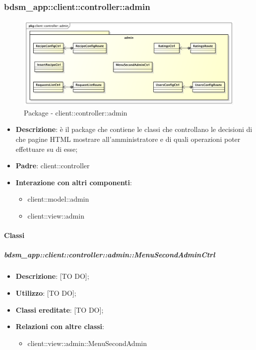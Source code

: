 





\subsubsection{bdsm\_app::client::controller::admin} %
\label{ssub:bdsm_app_client_controller_admin}
\begin{figure}[htbp]
	\centering
	\centerline{\includegraphics[scale=0.45]{./images/client_controller_admin.pdf}}
	\caption{Package - client::controller::admin}
\end{figure}

\begin{itemize}
	\item \textbf{Descrizione}: è il package che contiene le classi che controllano le decisioni di che pagine HTML mostrare all'amministratore e di quali operazioni poter effettuare su di esse;
	\item \textbf{Padre}: client::controller
	\item \textbf{Interazione con altri componenti}:
		\begin{itemize}
			\item client::model::admin
			\item client::view::admin
		\end{itemize}
\end{itemize}

	\paragraph{Classi} %
		\subparagraph{bdsm\_app::client::controller::admin::MenuSecondAdminCtrl} %
		\label{subp:bdsm_app_client_controller_admin_menusecondadminctrl}
			\begin{itemize}
				\item \textbf{Descrizione}: [TO DO];
				\item \textbf{Utilizzo}: [TO DO];
				\item \textbf{Classi ereditate}: [TO DO];
				\item \textbf{Relazioni con altre classi}:
					\begin{itemize}
						\item client::view::admin::MenuSecondAdmin
					\end{itemize}
			\end{itemize}

